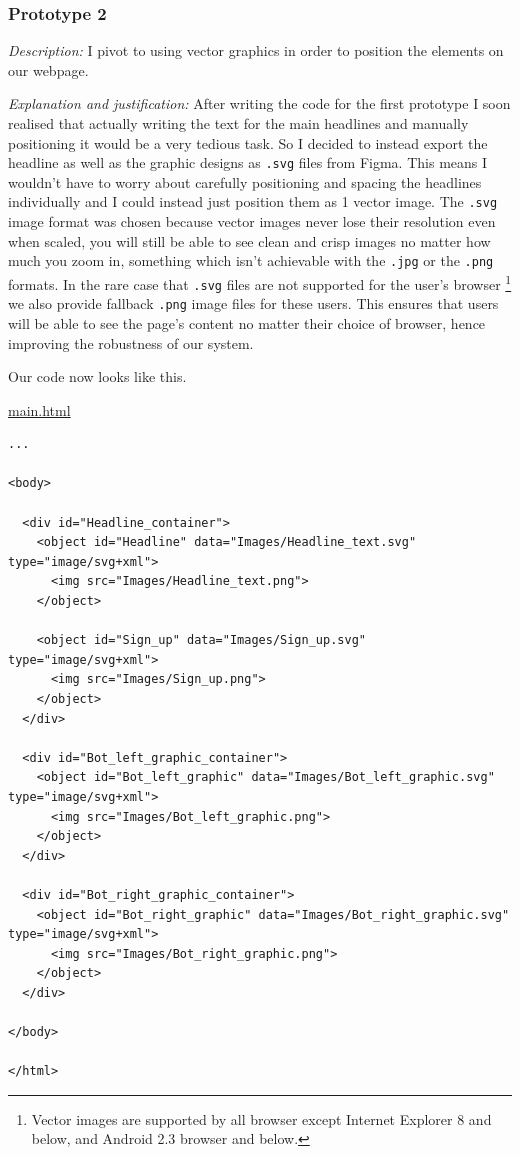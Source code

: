 {\color{gray} \hrulefill}

\subsubsection{Prototype 2}

\textit{Description:}
I pivot to using vector graphics in order to position the
elements on our webpage. \\ \vspace{0.2cm}

\textit{Explanation and justification:}
After writing the code for the first prototype I soon realised
that actually writing the text for the main headlines and
manually positioning it would be a very tedious task. So I
decided to instead export the headline as well as the graphic
designs as \texttt{.svg} files from Figma. This means I
wouldn't have to worry about carefully positioning and spacing
the headlines individually and I could instead just position
them as 1 vector image. The \texttt{.svg} image format was
chosen because vector images never lose their resolution even
when scaled, you will still be able to see clean and crisp
images no matter how much you zoom in, something which isn't
achievable with the \texttt{.jpg} or the \texttt{.png} formats.
In the rare case that \texttt{.svg} files are not supported
for the user's browser \footnote{Vector images are supported
by all browser except Internet Explorer 8 and below, and
Android 2.3 browser and below.} we also provide fallback
\texttt{.png} image files for these users. This ensures that
users will be able to see the page's content no matter their
choice of browser, hence improving the robustness of our
system.\\ \vspace{0.2cm}

Our code now looks like this.

\underline{main.html}
\begin{verbatim}
...

<body>

  <div id="Headline_container">
    <object id="Headline" data="Images/Headline_text.svg" type="image/svg+xml">
      <img src="Images/Headline_text.png">
    </object>

    <object id="Sign_up" data="Images/Sign_up.svg" type="image/svg+xml">
      <img src="Images/Sign_up.png">
    </object>
  </div>

  <div id="Bot_left_graphic_container">
    <object id="Bot_left_graphic" data="Images/Bot_left_graphic.svg" type="image/svg+xml">
      <img src="Images/Bot_left_graphic.png">
    </object>
  </div>

  <div id="Bot_right_graphic_container">
    <object id="Bot_right_graphic" data="Images/Bot_right_graphic.svg" type="image/svg+xml">
      <img src="Images/Bot_right_graphic.png">
    </object>
  </div>

</body>

</html>
\end{verbatim}

